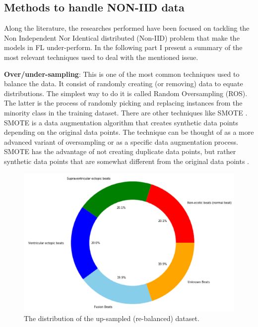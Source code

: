 \subsection{Methods to handle NON-IID data} \label{non_iid_handling}

Along the literature, the researches performed have been focused on tackling the Non Independent Nor Identical distributed (Non-IID) problem that make the models in FL under-perform. In the following part I present a summary of the most relevant techniques used to deal with the mentioned issue.

\textbf{Over/under-sampling}: This is one of the most common techniques used to balance the data. It consist of randomly creating (or removing) data to equate distributions. The simplest way to do it is called Random Oversampling (ROS). The latter is the process of randomly picking and replacing instances from the minority class in the training dataset. There are other techniques like SMOTE \cite{metrics_ecg1}. SMOTE is a data augmentation algorithm that creates synthetic data points depending on the original data points. The technique can be thought of as a more advanced variant of oversampling or as a specific data augmentation process. SMOTE has the advantage of not creating duplicate data points, but rather synthetic data points that are somewhat different from the original data points \cite{imbalance_data3}.

\begin{figure}[H]
\centering
\includegraphics[scale=0.6]{img/metrics_ecg1_ROS.PNG}
\caption{The distribution of the up-sampled (re-balanced) dataset. \cite{metrics_ecg1}}
\label{fig:metrics_ecg1_ROS}
\end{figure}



